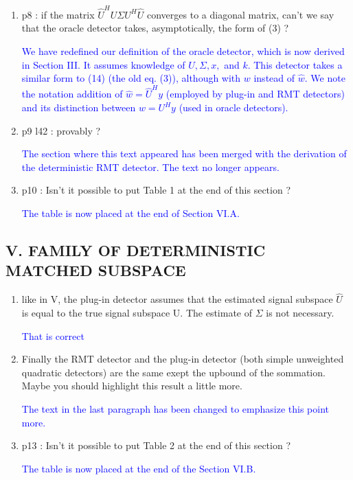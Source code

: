 \documentclass[11pt]{article}
\begin{document}
\begin{enumerate}
\item p8 : if the matrix $\hat{U}^HU\Sigma U^H\hat{U}$ converges to a diagonal matrix, can't we say that the oracle detector takes,
asymptotically, the form of (3) ?

\textcolor{blue}{We have redefined our definition of the oracle detector, which is now derived in Section III. It assumes knowledge of $U,\Sigma,x,$ and $k$. This detector takes a similar form to (14) (the old eq. (3)), although with $w$ instead of $\widehat{w}$. We note the notation addition of $\widehat{w}=\widehat{U}^Hy$ (employed by plug-in and RMT detectors) and its distinction between $w=U^Hy$ (used in oracle detectors).}

\item p9 l42 : provably ?

\textcolor{blue}{The section where this text appeared has been merged with the derivation of the deterministic RMT detector. The text no longer appears.}

\item p10 : Isn't it possible to put Table 1 at the end of this section ?

\textcolor{blue}{The table is now placed at the end of Section VI.A.}

\end{enumerate}
\subsection*{V. FAMILY OF DETERMINISTIC MATCHED SUBSPACE }
\begin{enumerate}
\item like in V, the plug-in detector assumes that the estimated signal subspace $\hat{U}$ is equal to the true signal
subspace U. The estimate of $\Sigma$ is not necessary.

\textcolor{blue}{That is correct}

\item Finally the RMT detector and the plug-in detector (both simple unweighted quadratic detectors) are the
same exept the upbound of the sommation. Maybe you should highlight this result a little more.

\textcolor{blue}{The text in the last paragraph has been changed to emphasize this point more.}

\item p13 : Isn't it possible to put Table 2 at the end of this section ?

\textcolor{blue}{The table is now placed at the end of the Section VI.B.}

\end{enumerate}
\end{document}
